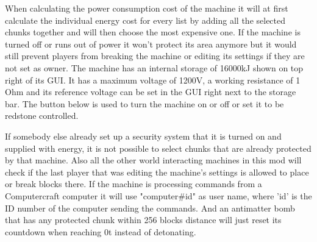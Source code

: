\documentclass[11pt]{article} %
\begin{document}
When calculating the power consumption cost of the machine it will at first calculate the individual energy cost for every list by adding all the selected chunks together and will then choose the most expensive one. If the machine is turned off or runs out of power it won't protect its area anymore but it would still prevent players from breaking the machine or editing its settings if they are not set as owner. The machine has an internal storage of 16000kJ shown on top right of its GUI. It has a maximum voltage of 1200V, a working resistance of 1 Ohm and its reference voltage can be set in the GUI right next to the storage bar. The button below is used to turn the machine on or off or set it to be redstone controlled.

If somebody else already set up a security system that it is turned on and supplied with energy, it is not possible to select chunks that are already protected by that machine. Also all the other world interacting machines in this mod will check if the last player that was editing the machine's settings is allowed to place or break blocks there. If the machine is processing commands from a Computercraft computer it will use "computer\#id" as user name, where 'id' is the ID number of the computer sending the commands. And an antimatter bomb that has any protected chunk within 256 blocks distance will just reset its countdown when reaching 0t instead of detonating.
\end{document}
